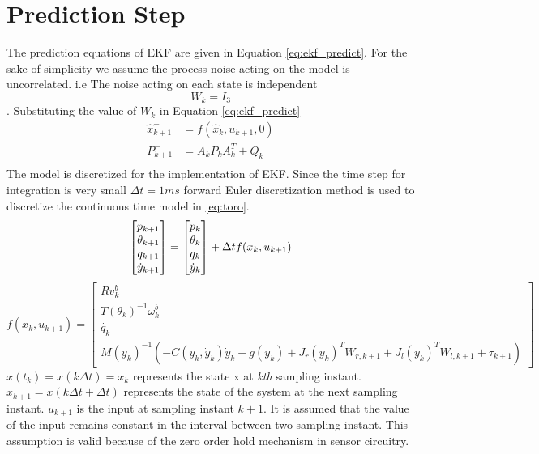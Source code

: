 \section{Prediction Step}
The prediction equations of EKF are given in Equation \ref{eq:ekf_predict}. For the sake of simplicity we assume the process noise acting on the model is uncorrelated. i.e The noise acting on each state is independent $$W_k = I_{3}$$. Substituting the value of $W_k$ in Equation \ref{eq:ekf_predict}
\begin{equation}
\label{eq:predict}
\begin{split}
\hat{x}_{k+1}^- &= f(\hat{x}_{k},u_{k+1},0)\\
P_{k+1}^- &= A_kP_{k}A_k^T + Q_{k}\\
\end{split}
\end{equation}
The model is discretized for the implementation of EKF. Since the time step for integration is very small $\Delta t = 1ms$ forward Euler discretization method is used to discretize the continuous time model in \ref{eq:toro}.
\begin{equation}
\label{eq:toro_dis}
	\begin{bmatrix}
	p_{k+1} \\ \theta_{k+1} \\ q_{k+1} \\ \dot{y}_{k+1}
	\end{bmatrix}
	 =   
	 \begin{bmatrix}
	 p_{k} \\ \theta_{k} \\ q_{k} \\ \dot{y}_{k}
	\end{bmatrix}	  
	+ \Delta t f(x_k,u_{k+1}) \\
\end{equation}
$$ f(x_k,u_{k+1}) = 
	\begin{bmatrix}
	R v^b_k\\	
	T(\theta_k)^{-1} \omega_k^b\\
	\dot{q_k}\\
	M(y_k)^{-1}(-C(y_k,\dot{y}_k)\dot{y}_k -g(y_k) +  J_r(y_k)^{T}W_{r,k+1} +J_l(y_k)^{T}W_{l,k+1} + \tau_{k+1})	
	\end{bmatrix} $$
$x(t_k) = x(k \Delta t) = x_k$ represents the state x at \emph{kth} sampling instant. $x_{k+1} = x(k \Delta t + \Delta t)$ represents the state of the system at the next sampling instant. $u_{k+1}$ is the input at sampling instant $k+1$. It is assumed that the value of the input remains constant in the interval between two sampling instant. This assumption is valid because of the zero order hold mechanism in sensor circuitry.

